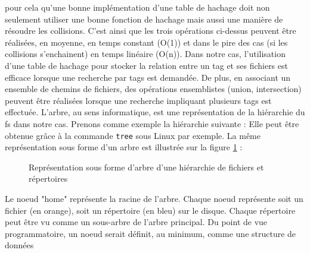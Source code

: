 \documentclass[a4paper, 12pt]{article}
\begin{document}
pour cela qu'une bonne implémentation d'une table de hachage doit non seulement utiliser une bonne 
fonction de hachage mais aussi une manière de résoudre les collisions. C'est ainsi que les trois 
opérations ci-dessus peuvent être réalisées, en moyenne, en temps constant (O(1)) et dans le pire 
des cas (si les collisions s'enchainent) en temps linéaire (O(n)). Dans notre cas, l'utilisation 
d'une table de hachage pour stocker la relation entre un tag et ses fichiers est efficace lorsque 
une recherche par tags est demandée. De plus, en associant un ensemble de chemins de fichiers, 
des opérations ensemblistes (union, intersection) peuvent être réalisées lorsque une recherche 
impliquant plusieurs tags est effectuée.
\bigbreak
L'arbre, au sens informatique, est une représentation de la hiérarchie du \acrshort{fs} dans 
notre cas. Prenons comme exemple la hiérarchie suivante :
Elle peut être obtenue grâce à la commande \texttt{tree} sous Linux par exemple.
La même représentation sous forme d'un arbre est illustrée sur la figure \ref{tree} :
\begin{figure}
    \begin{center}
    \end{center}
    \caption{Représentation sous forme d'arbre d'une hiérarchie de fichiers et répertoires}
    \label{tree}
\end{figure}
Le noeud "home" représente la racine de l'arbre. Chaque noeud représente soit un fichier (en orange), soit 
un répertoire (en bleu) sur le disque. Chaque répertoire peut être vu comme un sous-arbre de l'arbre principal.
Du point de vue programmatoire, un noeud serait définit, au minimum, comme une structure de données 
\end{document}
